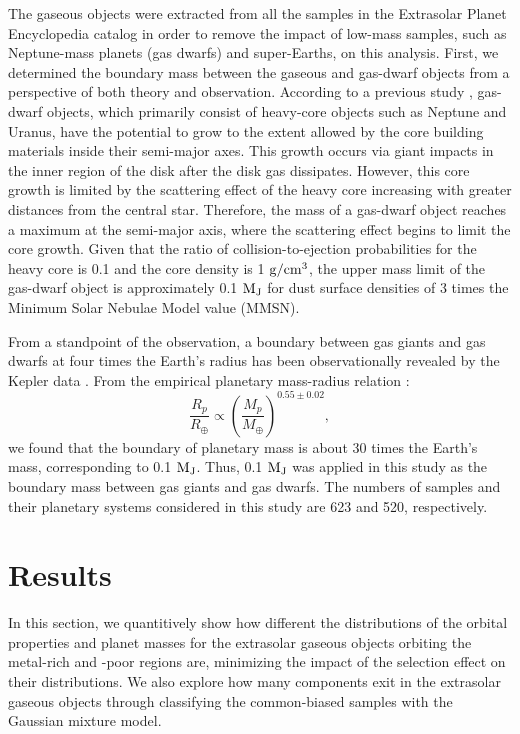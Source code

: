 \documentclass[twocolumn, dvipdfmx]{aastex62}
\begin{document}
\begin{CJK*}{UTF8}{min}
The gaseous objects were extracted from all the samples in the Extrasolar Planet Encyclopedia catalog in order to remove the impact of low-mass samples, such as Neptune-mass planets (gas dwarfs) and super-Earths, on this analysis. First, we determined the boundary mass between the gaseous and gas-dwarf objects from a perspective of both theory and observation. According to a previous study \citep{2004ApJ...604..388I}, gas-dwarf objects, which primarily consist of heavy-core objects such as Neptune and Uranus, have the potential to grow to the extent allowed by the core building materials inside their semi-major axes. This growth occurs via giant impacts in the inner region of the disk after the disk gas dissipates. However, this core growth is limited by the scattering effect of the heavy core increasing with greater distances from the central star. Therefore, the mass of a gas-dwarf object reaches a maximum at the semi-major axis, where the scattering effect begins to limit the core growth. Given that the ratio of collision-to-ejection probabilities for the heavy core is 0.1 and the core density is 1 $\rm g/cm^3$, the upper mass limit of the gas-dwarf object is approximately 0.1 $\rm M_J$ for dust surface densities of 3 times the Minimum Solar Nebulae Model value (MMSN).

From a standpoint of the observation, a boundary between gas giants and gas dwarfs at four times the Earth's radius has been observationally revealed by the Kepler data \citep{2012Natur.486..375B}. From the empirical planetary mass-radius relation \citep[e.g.,][]{2017A&A...604A..83B}:
\begin{equation}
\frac{R_p}{R_\oplus} \propto \left(\frac{M_p}{M_\oplus}\right)^{0.55\pm0.02} ,
\end{equation}
we found that the boundary of planetary mass is about 30 times the Earth's mass, corresponding to 0.1 $\rm M_J$. Thus, 0.1 $\rm M_J$ was applied in this study as the boundary mass between gas giants and gas dwarfs. The numbers of samples and their planetary systems considered in this study are 623 and 520, respectively.


\section{Results} \label{sec:results}

In this section, we quantitively show how different the distributions of the orbital properties and planet masses for the extrasolar gaseous objects orbiting the metal-rich and -poor regions are, minimizing the impact of the selection effect on their distributions. We also explore how many components exit in the extrasolar gaseous objects through classifying the common-biased samples with the Gaussian mixture model.



\end{CJK*}
\end{document}
